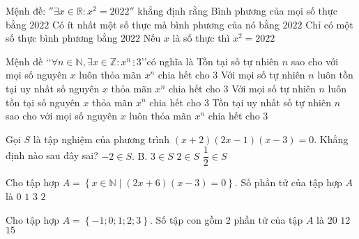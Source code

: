 \begin{ex}
	Mệnh đề: $''\exists x\in \mathbb{R}\colon x^2=2022''$ khẳng định rằng
	\choice
	{Bình phương của mọi số thực bằng $2022$}
	{\True Có ít nhất một số thực mà bình phương của nó bằng $2022$}
	{Chỉ có một số thực bình phương bằng $2022$}
	{Nếu ${x}$ là số thực thì $x^2=2022$}
\end{ex}
\begin{ex}
	Mệnh đề \lq\lq  $\forall n\in \mathbb{N},\exists x\in \mathbb{Z}\colon x^n\, \vdots\, 3$\rq\rq có nghĩa là
	\choice
	{Tồn tại số tự nhiên $n$ sao cho với mọi số nguyên $x$ luôn thỏa mãn $x^n$ chia hết cho 3}
	{Với mọi số tự nhiên $n$ luôn tồn tại uy nhất số nguyên $x$ thỏa mãn $x^n$ chia hết cho 3}
	{\True Với mọi số tự nhiên $n$ luôn tồn tại số nguyên $x$ thỏa mãn $x^n$ chia hết cho 3}
	{Tồn tại uy nhất số tự nhiên $n$ sao cho với mọi số nguyên $x$ luôn thỏa mãn $x^n$ chia hết cho 3}
\end{ex}
\begin{ex}
	Gọi $S$ là tập nghiệm của phương trình $(x+2)(2x-1)(x-3)=0$. Khẳng định nào sau đây sai?
	\choice
	{$-2\in S$. B. $3\in S$}
	{\True $2\in S$}
	{$\dfrac{1}{2}\in S$}
\end{ex}
\begin{ex}
	Cho tập hợp $A=\left\{ x\in \mathbb{N}\mid (2x+6)(x-3)=0 \right\}$. Số phần tử của tập hợp $A$ là
	\choice
	{$0$}
	{\True $1$}
	{$3$}
	{$2$}
\end{ex}
\begin{ex}
	Cho tập hợp $A=\left\{ -1;0;1;2;3 \right\}$. Số tập con gồm 2 phần tử của tập $A$ là
	\choice
	{$20$}
	{}
	{$12$}
	{$15$}
\end{ex}
